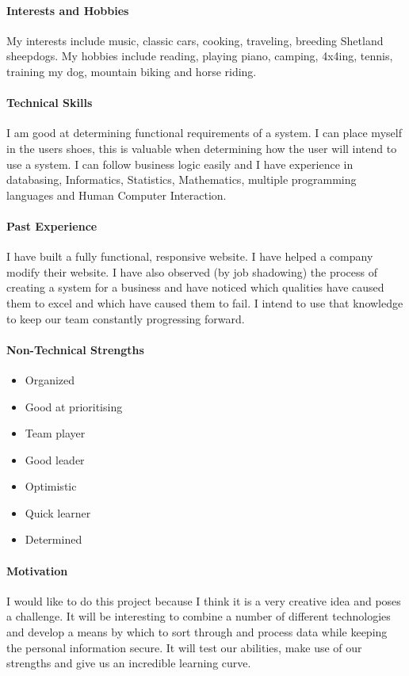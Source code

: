 \documentclass[english]{article}
\begin{document}
			\paragraph{Interests and Hobbies}
			My interests include music, classic cars, cooking, traveling, breeding Shetland sheepdogs. My hobbies include reading, playing piano, camping, 4x4ing, tennis, training my dog, mountain biking and horse riding.
			
			\paragraph{Technical Skills}
			I am good at determining functional requirements of a system. I can place myself in the users shoes, this is valuable when determining how the user will intend to use a system. I can follow business logic easily and I have experience in databasing, Informatics, Statistics, Mathematics, multiple programming languages and Human Computer Interaction.
			
			\paragraph{Past Experience}
			I have built a fully functional, responsive website. I have helped a company modify their website. I have also observed (by job shadowing) the process of creating a system for a business and have noticed which qualities have caused them to excel and which have caused them to fail. I intend to use that knowledge to keep our team constantly progressing forward.
			
			\paragraph{Non-Technical Strengths}
			\begin{itemize}
				\setlength\itemsep{0.2em}
			        \item Organized
			        \item Good at prioritising 
			        \item Team player
			        \item Good leader
			        \item Optimistic
			        \item Quick learner
			        \item Determined
			\end{itemize}
			
			\paragraph{Motivation}
			I would like to do this project because I think it is a very creative idea and poses a challenge. It will be interesting to combine a number of different technologies and develop a means by which to sort through and process data while keeping the personal information secure. It will test our abilities, make use of our strengths and give us an incredible learning curve.
		
\end{document}
